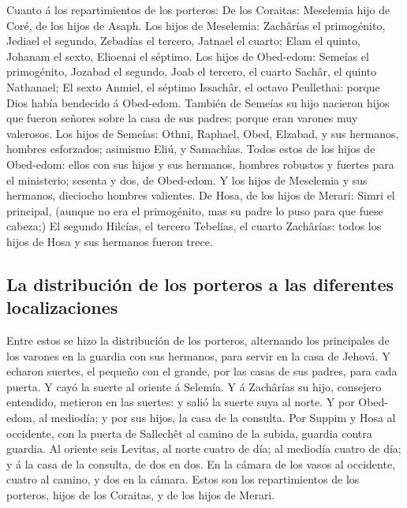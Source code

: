  Cuanto á los repartimientos de los porteros: De los
Coraitas: Meselemia hijo de Coré, de los hijos de Asaph. 
Los hijos de Meselemia: Zachârías el primogénito, Jediael el segundo,
Zebadías el tercero, Jatnael el cuarto;  Elam el quinto,
Johanam el sexto, Elioenai el séptimo.  Los hijos de
Obed-edom: Semeías el primogénito, Jozabad el segundo, Joab el tercero,
el cuarto Sachâr, el quinto Nathanael;  El sexto Anmiel,
el séptimo Issachâr, el octavo Peullethai: porque Dios había bendecido á
Obed-edom.  También de Semeías su hijo nacieron hijos que
fueron señores sobre la casa de sus padres; porque eran varones muy
valerosos.  Los hijos de Semeías: Othni, Raphael, Obed,
Elzabad, y sus hermanos, hombres esforzados; asimismo Eliú, y Samachîas.
 Todos estos de los hijos de Obed-edom: ellos con sus
hijos y sus hermanos, hombres robustos y fuertes para el ministerio;
sesenta y dos, de Obed-edom.  Y los hijos de Meselemia y
sus hermanos, dieciocho hombres valientes.  De Hosa, de
los hijos de Merari: Simri el principal, (aunque no era el primogénito,
mas su padre lo puso para que fuese cabeza;)  El segundo
Hilcías, el tercero Tebelías, el cuarto Zachârías: todos los hijos de
Hosa y sus hermanos fueron trece.

\hypertarget{la-distribuciuxf3n-de-los-porteros-a-las-diferentes-localizaciones}{%
\subsection{La distribución de los porteros a las diferentes
localizaciones}\label{la-distribuciuxf3n-de-los-porteros-a-las-diferentes-localizaciones}}

 Entre estos se hizo la distribución de los porteros,
alternando los principales de los varones en la guardia con sus
hermanos, para servir en la casa de Jehová.  Y echaron
suertes, el pequeño con el grande, por las casas de sus padres, para
cada puerta.  Y cayó la suerte al oriente á Selemía. Y á
Zachârías su hijo, consejero entendido, metieron en las suertes: y salió
la suerte suya al norte.  Y por Obed-edom, al mediodía; y
por sus hijos, la casa de la consulta.  Por Suppim y Hosa
al occidente, con la puerta de Sallechêt al camino de la subida, guardia
contra guardia.  Al oriente seis Levitas, al norte cuatro
de día; al mediodía cuatro de día; y á la casa de la consulta, de dos en
dos.  En la cámara de los vasos al occidente, cuatro al
camino, y dos en la cámara.  Estos son los repartimientos
de los porteros, hijos de los Coraitas, y de los hijos de Merari.

